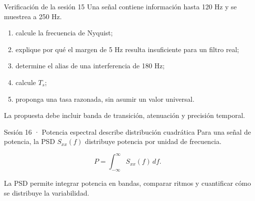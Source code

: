 \documentclass[
  ignorenonframetext,
  aspectratio=169,
  spanish,
]{beamer}
\providecommand{\faExclamation}{\faIcon{exclamation}}
\providecommand{\tightlist}{%
  \setlength{\itemsep}{0pt}\setlength{\parskip}{0pt}}
\begin{document}
\begin{frame}{Verificación de la sesión 15}
  \protect{}\label{verificaciuxf3n-de-la-sesiuxf3n-15}
  Una señal contiene información hasta 120 Hz y se muestrea a 250 Hz.

  \begin{enumerate}
    \tightlist
    \item
          calcule la frecuencia de Nyquist;
    \item
          explique por qué el margen de 5 Hz resulta insuficiente para un filtro
          real;
    \item
          determine el alias de una interferencia de 180 Hz;
    \item
          calcule \(T_s\);
    \item
          proponga una tasa razonada, sin asumir un valor universal.
  \end{enumerate}

  \begin{tcolorbox}[enhanced jigsaw, arc=.35mm, bottomrule=.15mm, bottomtitle=1mm, breakable, colback=white, colbacktitle=quarto-callout-tip-color!10!white, colframe=quarto-callout-tip-color-frame, coltitle=black, left=2mm, leftrule=.75mm, opacityback=0, opacitybacktitle=0.6, rightrule=.15mm, title=\textcolor{quarto-callout-tip-color}{\faLightbulb}\hspace{0.5em}{Criterio de logro}, titlerule=0mm, toprule=.15mm, toptitle=1mm]

    La propuesta debe incluir banda de transición, atenuación y precisión
    temporal.

  \end{tcolorbox}
\end{frame}

\begin{frame}{Sesión 16 · Potencia espectral describe distribución
    cuadrática}
  \protect{}\label{sesiuxf3n-16-potencia-espectral-describe-distribuciuxf3n-cuadruxe1tica}
  Para una señal de potencia, la PSD \(S_{xx}(f)\) distribuye potencia por
  unidad de frecuencia.

  \[P=\int_{-\infty}^{\infty}S_{xx}(f)\,df.\]

  \begin{tcolorbox}[enhanced jigsaw, arc=.35mm, bottomrule=.15mm, bottomtitle=1mm, breakable, colback=white, colbacktitle=quarto-callout-important-color!10!white, colframe=quarto-callout-important-color-frame, coltitle=black, left=2mm, leftrule=.75mm, opacityback=0, opacitybacktitle=0.6, rightrule=.15mm, title=\textcolor{quarto-callout-important-color}{\faExclamation}\hspace{0.5em}{Importante}, titlerule=0mm, toprule=.15mm, toptitle=1mm]

    La PSD permite integrar potencia en bandas, comparar ritmos y
    cuantificar cómo se distribuye la variabilidad.

  \end{tcolorbox}
\end{frame}
\end{document}
